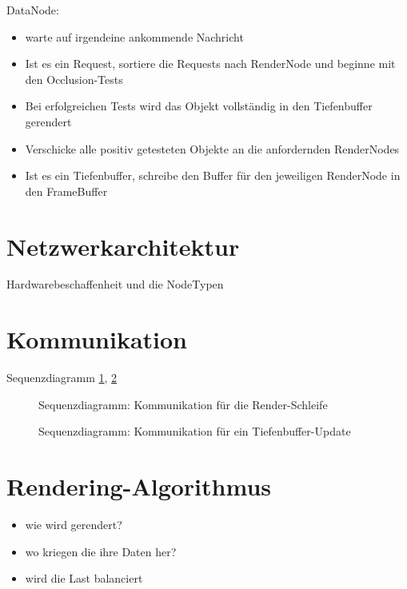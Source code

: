 \label{datanode}
DataNode:
\begin{itemize}
 \item warte auf irgendeine ankommende Nachricht
 \item Ist es ein Request, sortiere die Requests nach RenderNode und beginne mit den Occlusion-Tests
 \item Bei erfolgreichen Tests wird das Objekt vollständig in den Tiefenbuffer gerendert
 \item Verschicke alle positiv getesteten Objekte an die anfordernden RenderNodes
 \item Ist es ein Tiefenbuffer, schreibe den Buffer für den jeweiligen RenderNode in den FrameBuffer
\end{itemize}


\section{Netzwerkarchitektur}
\label{sec:impl:netzwerkarchitektur}
%
Hardwarebeschaffenheit und die NodeTypen

\section{Kommunikation}
\label{sec:impl:kommunikation}
%
Sequenzdiagramm \ref{fig:impl:seqdiagrender}, \ref{fig:impl:seqdiagdepth}

\begin{figure}

  \caption{Sequenzdiagramm: Kommunikation für die Render-Schleife}
  \label{fig:impl:seqdiagrender}
\end{figure}

\begin{figure}

  \caption{Sequenzdiagramm: Kommunikation für ein Tiefenbuffer-Update}
  \label{fig:impl:seqdiagdepth}
\end{figure}

\section{Rendering-Algorithmus}
\label{sec:impl:renderalgo}
%
\begin{itemize}
 \item wie wird gerendert?
 \item wo kriegen die ihre Daten her?
 \item wird die Last balanciert
\end{itemize}


%
%
